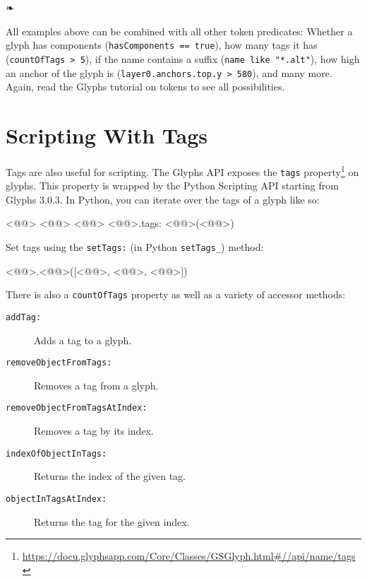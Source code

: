 \begin{center}
  ❧
\end{center}

\vspace{3mm plus 2pt minus 2pt}\noindent All examples above can be combined with all other token predicates:
Whether a glyph has components (\texttt{hasComponents == true}),
how many tags it has (\texttt{countOfTags > 5}),
if the name contains a suffix (\texttt{name like "*.alt"}),
how high an anchor of the glyph is (\texttt{layer0.anchors.top.y > 580}),
and many more.
Again, read the Glyphs tutorial on tokens to see all possibilities.

\section{Scripting With Tags}%
\label{sec:scripting_with_tags}

Tags are also useful for scripting.
The Glyphs API exposes the \texttt{tags} property\footnote{\url{https://docu.glyphsapp.com/Core/Classes/GSGlyph.html\#//api/name/tags}} on glyphs.
This property is wrapped by the Python Scripting API starting from Glyphs 3.0.3.
In Python, you can iterate over the tags of a glyph like so:

\begin{RichListing}
<@@> <@@> <@@> <@@>.tags:
    <@@>(<@@>)
\end{RichListing}

\medbreak\noindent{}

\bigbreak\noindent Set tags using the \texttt{setTags:} (in Python \texttt{setTags\_}) method:

\begin{RichListing}
<@@>.<@@>([<@@>, <@@>, <@@>])
\end{RichListing}

\noindent There is also a \texttt{countOfTags} property as well as a variety of accessor methods:

\begin{description}
  \item[\texttt{addTag:}]
    Adds a tag to a glyph.
  
  \item[\texttt{removeObjectFromTags:}]
    Removes a tag from a glyph.
  
  \item[\texttt{removeObjectFromTagsAtIndex:}]
    Removes a tag by its index.
  
  \item[\texttt{indexOfObjectInTags:}]
    Returns the index of the given tag.
  
  \item[\texttt{objectInTagsAtIndex:}]
    Returns the tag for the given index.
\end{description}

